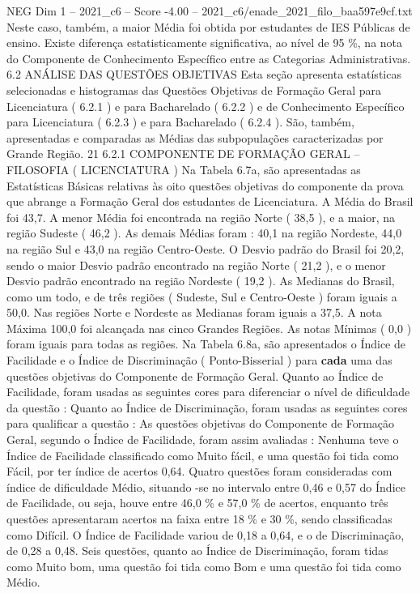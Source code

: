 \begin{textsample}{NEG Dim 1 – 2021\_c6 – Score -4.00 – 2021\_c6/enade\_2021\_filo\_baa597e9cf.txt}
Neste caso, também, a maior Média foi obtida por estudantes de IES Públicas de ensino.
Existe diferença estatisticamente significativa, ao nível de 95 \%, na nota do Componente de Conhecimento Específico entre as Categorias Administrativas. 6.2 ANÁLISE DAS QUESTÕES OBJETIVAS Esta seção apresenta estatísticas selecionadas e histogramas das Questões Objetivas de Formação Geral para Licenciatura ( 6.2.1 ) e para Bacharelado ( 6.2.2 ) e de Conhecimento Específico para Licenciatura ( 6.2.3 ) e para Bacharelado ( 6.2.4 ).
São, também, apresentadas e comparadas as Médias das subpopulações caracterizadas por Grande Região. 21 6.2.1 COMPONENTE DE FORMAÇÃO GERAL – FILOSOFIA ( LICENCIATURA ) Na Tabela 6.7a, são apresentadas as Estatísticas Básicas relativas às oito questões objetivas do componente da prova que abrange a Formação Geral dos estudantes de Licenciatura.
A Média do Brasil foi 43,7.
A menor Média foi encontrada na região Norte ( 38,5 ), e a maior, na região Sudeste ( 46,2 ).
As demais Médias foram : 40,1 na região Nordeste, 44,0 na região Sul e 43,0 na região Centro-Oeste.
O Desvio padrão do Brasil foi 20,2, sendo o maior Desvio padrão encontrado na região Norte ( 21,2 ), e o menor Desvio padrão encontrado na região Nordeste ( 19,2 ).
As Medianas do Brasil, como um todo, e de três regiões ( Sudeste, Sul e Centro-Oeste ) foram iguais a 50,0.
Nas regiões Norte e Nordeste as Medianas foram iguais a 37,5.
A nota Máxima 100,0 foi alcançada nas cinco Grandes Regiões.
As notas Mínimas ( 0,0 ) foram iguais para todas as regiões.
Na Tabela 6.8a, são apresentados o Índice de Facilidade e o Índice de Discriminação ( Ponto-Bisserial ) para \textbf{cada} uma das questões objetivas do Componente de Formação Geral.
Quanto ao Índice de Facilidade, foram usadas as seguintes cores para diferenciar o nível de dificuldade da questão : Quanto ao Índice de Discriminação, foram usadas as seguintes cores para qualificar a questão : As questões objetivas do Componente de Formação Geral, segundo o Índice de Facilidade, foram assim avaliadas : Nenhuma teve o Índice de Facilidade classificado como Muito fácil, e uma questão foi tida como Fácil, por ter índice de acertos 0,64.
Quatro questões foram consideradas com índice de dificuldade Médio, situando -se no intervalo entre 0,46 e 0,57 do Índice de Facilidade, ou seja, houve entre 46,0 \% e 57,0 \% de acertos, enquanto três questões apresentaram acertos na faixa entre 18 \% e 30 \%, sendo classificadas como Difícil.
O Índice de Facilidade variou de 0,18 a 0,64, e o de Discriminação, de 0,28 a 0,48.
Seis questões, quanto ao Índice de Discriminação, foram tidas como Muito bom, uma questão foi tida como Bom e uma questão foi tida como Médio.

\end{textsample}
